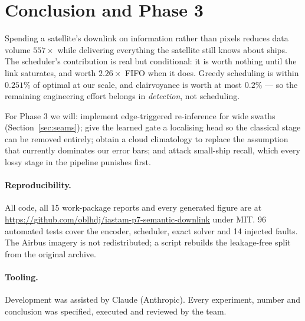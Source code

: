 \documentclass[10pt,a4paper]{article}
\begin{document}
\section{Conclusion and Phase 3}

Spending a satellite's downlink on information rather than pixels reduces data volume
$557\times$ while delivering everything the satellite still knows about ships. The scheduler's
contribution is real but conditional: it is worth nothing until the link saturates, and worth
$2.26\times$ FIFO when it does. Greedy scheduling is within $0.251\%$ of optimal at our scale, and
clairvoyance is worth at most $0.2\%$ --- so the remaining engineering effort belongs in
\emph{detection}, not scheduling.

For Phase 3 we will: implement edge-triggered re-inference for wide swaths
(Section~\ref{sec:seams}); give the learned gate a localising head so the classical stage can be
removed entirely; obtain a cloud climatology to replace the assumption that currently dominates
our error bars; and attack small-ship recall, which every lossy stage in the pipeline punishes
first.

\paragraph{Reproducibility.} All code, all 15 work-package reports and every generated figure are
at \url{https://github.com/oblhdj/iastam-p7-semantic-downlink} under MIT. 96 automated tests cover
the encoder, scheduler, exact solver and 14 injected faults. The Airbus imagery is not
redistributed; a script rebuilds the leakage-free split from the original archive.

\paragraph{Tooling.} Development was assisted by Claude (Anthropic). Every experiment, number and
conclusion was specified, executed and reviewed by the team.
\end{document}

